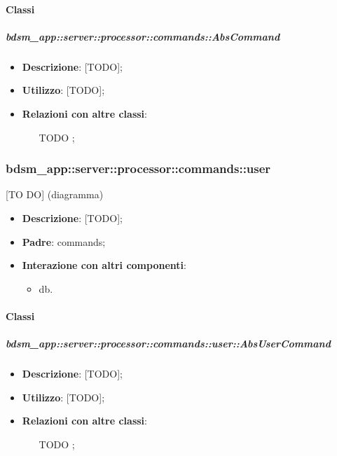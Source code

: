       \paragraph{Classi} %

      \subparagraph{bdsm\_app::server::processor::commands::AbsCommand} %
      \label{subp:bdsm_app_server_processor_updaterecipetask}
      \begin{itemize}
        \item \textbf{Descrizione}: [TODO];
        \item \textbf{Utilizzo}: [TODO];
        \item \textbf{Relazioni con altre classi}:
          \begin{itemize}
            \item [TODO];
          \end{itemize}
      \end{itemize}


      \subsubsection{bdsm\_app::server::processor::commands::user} %
      \label{ssub:bdsm_app_server_processor_commands_user}
      [TO DO] (diagramma) \newline \newline

      \begin{itemize}
        \item \textbf{Descrizione}: [TODO];
        \item \textbf{Padre}: commands;
        \item \textbf{Interazione con altri componenti}:
          \begin{itemize}
            \item db.
          \end{itemize}
      \end{itemize}

        \paragraph{Classi} %

        \subparagraph{bdsm\_app::server::processor::commands::user::AbsUserCommand} %
        \label{subp:bdsm_app_server_processor_commands_user_absusercommand}
        \begin{itemize}
          \item \textbf{Descrizione}: [TODO];
          \item \textbf{Utilizzo}: [TODO];
          \item \textbf{Relazioni con altre classi}:
            \begin{itemize}
              \item [TODO];
            \end{itemize}
        \end{itemize}

